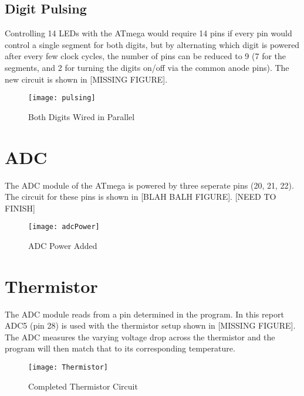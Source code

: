 \documentclass[main.tex]{subfiles}
\begin{document}
		\subsection{Digit Pulsing}
		Controlling 14 LEDs with the ATmega would require 14 pins if every pin would control a single
		segment for both digits, but by alternating which digit is powered after every few clock cycles,
		the number of pins can be reduced to 9 (7 for the segments, and 2 for turning the digits on/off
		via the common anode pins). The new circuit is shown in [MISSING FIGURE].
		\begin{figure}[H]
			\begin{center}
				\texttt{[image: pulsing]}
			\end{center}
			\caption{Both Digits Wired in Parallel}
			\label{fig:whatIsThis}
		\end{figure}
		
	\section{ADC}
	The ADC module of the ATmega is powered by three seperate pins (20, 21, 22). The circuit for
	these pins is shown in [BLAH BALH FIGURE]. [NEED TO FINISH]
	\begin{figure}[H]
		\begin{center}
			\texttt{[image: adcPower]}
		\end{center}
		\caption{ADC Power Added}
		\label{fig:whatIsThis}
	\end{figure}

	\section{Thermistor}
	The ADC module reads from a pin determined in the program. In this report ADC5 (pin 28) is used
	with the thermistor setup shown in [MISSING FIGURE]. The ADC measures the varying voltage drop
	across the thermistor and the program will then match that to its corresponding temperature.
	\begin{figure}[H]
		\begin{center}
			\texttt{[image: Thermistor]}
		\end{center}
		\caption{Completed Thermistor Circuit}
		\label{fig:ascSA}
	\end{figure}
\end{document}
